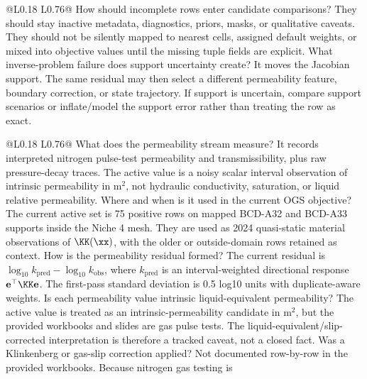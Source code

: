 \begin{longtable}{@{}L{0.18\textwidth} L{0.76\textwidth}@{}}
{ How should incomplete rows enter candidate comparisons?}
{They should stay inactive metadata, diagnostics, priors, masks, or qualitative
caveats.  They should not be silently mapped to nearest cells, assigned default
weights, or mixed into objective values until the missing tuple fields are explicit.}
{ What inverse-problem failure does support uncertainty create?}
{It moves the Jacobian support.  The same residual may then select a different
permeability feature, boundary correction, or state trajectory.  If support is
uncertain, compare support scenarios or inflate/model the support error rather than
treating the row as exact.}
\bottomrule
\end{longtable}

\begin{longtable}{@{}L{0.18\textwidth} L{0.76\textwidth}@{}}
\toprule
{}
{ What does the permeability stream measure?}
{It records interpreted nitrogen pulse-test permeability and transmissibility, plus
raw pressure-decay traces.  The active value is a noisy scalar interval
observation of intrinsic permeability in \(\mathrm{m^2}\), not hydraulic
conductivity, saturation, or liquid relative permeability.}
{ Where and when is it used in the current OGS objective?}
{The current active set is 75 positive rows on mapped BCD-A32 and BCD-A33 supports
inside the Niche 4 mesh.  They are used as 2024 quasi-static material observations
of \(\KK(\xx)\), with the older or outside-domain rows retained as context.}
{ How is the permeability residual formed?}
{The current residual is
\(\log_{10} k_{\mathrm{pred}}-\log_{10} k_{\mathrm{obs}}\), where
\(k_{\mathrm{pred}}\) is an interval-weighted directional response
\(\mathbf e^\top\KK\mathbf e\).  The first-pass standard deviation is
0.5 log10 units with duplicate-aware weights.}
{ Is each permeability value intrinsic liquid-equivalent permeability?}
{The active value is treated as an intrinsic-permeability candidate in
\(\mathrm{m^2}\), but the provided workbooks and slides are gas pulse tests.  The
liquid-equivalent/slip-corrected interpretation is therefore a tracked caveat, not a
closed fact.}
{ Was a Klinkenberg or gas-slip correction applied?}
{Not documented row-by-row in the provided workbooks.  Because nitrogen gas testing is
}
\end{longtable}
